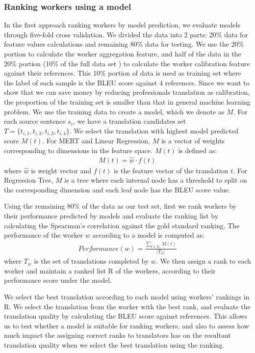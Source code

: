 \documentclass[11pt]{article}
\begin{document}
\subsubsection{Ranking workers using a model}
In the first approach ranking workers by model prediction, we evaluate models through five-fold cross validation. We divided the data into 2 parts: 20\% data for feature values calculations and remaining 80\% data for testing. We use the  20\% portion to calculate the worker aggregation feature, and half of the data in the 20\% portion (10\% of the full data set ) to calculate the worker calibration feature against their references.  This 10\% portion of data is used as training set where the label of each sample is the BLEU score against 4 references. Since we want to show that we can save money by reducing professionals translation as calibration, the proportion of the training set is smaller than that in general machine learning problem. We use the training data to create a model, which we denote as $M$. For each source sentence $s_i$, we have a translation candidates set $T = \{ t_{i,1}, t_{i,2},t_{i,3}, t_{i,4}\}$. We select the translation with highest model predicted score $M(t)$. For MERT and Linear Regression, $M$ is a vector of weights  corresponding to  dimensions in the feature space. $M(t)$ is defined as:
 \begin{align*}
  M(t) = \hat{w}  \cdot f(t) 
  \end{align*}
  where $\hat{w}$ is weight vector and $f(t)$ is the feature vector of the translation $t$. For Regression Tree, $M$ is a tree where each internal node has a threshold to split on the corresponding dimension and each leaf node has the BLEU score value. 
  
Using the remaining 80\% of the data as our test set, first we rank workers by their performance predicted by models and evaluate the ranking list by calculating the Spearman's correlation against the gold standard ranking. The performance of the worker $w$ according to a model is computed as:
\begin{align*}
Performance(w) = \frac{\sum_{t \in T_{w}} M (t)}{|T_{w}|}
 \end{align*}
 where $T_{w} $ is the set of translations completed by $w$. We then assign a rank to each worker and maintain a ranked list R of the workers, according to their performance score under the model. 
 
We select the best translation according to each model using workers' rankings in R.  We select the translation from the worker with the best rank, and evaluate the translation quality by calculating the BLEU score against references.  This allows us to test  whether a model is suitable for ranking workers, and also to assess how much impact the assigning correct ranks to translators has on the resultant translation quality  when we select the best translation using the ranking. 
\end{document}
